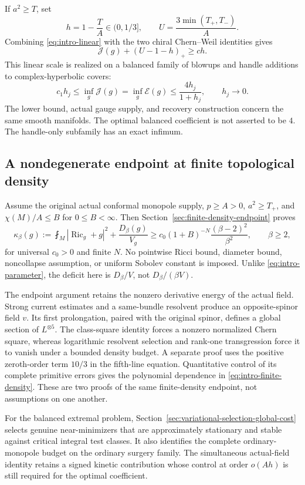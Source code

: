 \documentclass[10pt,a4paper]{article}
\theoremstyle{definition}
\theoremstyle{remark}
\numberwithin{equation}{section}
\providecommand{\Ric}{\operatorname{Ric}}
\providecommand{\E}{\mathcal E}
\providecommand{\J}{\mathcal J}
\begin{document}
If $a^2\ge T$, set
\[
 h=1-\frac TA\in(0,1/3],\qquad
 U=\frac{3\min(T_+,T_-)}{A}.
\]
Combining \eqref{eq:intro-linear} with the two chiral Chern--Weil
identities gives
\begin{equation}\label{eq:intro-window}
 \J(g)+(U-1-h)_+\ge ch.
\end{equation}
This linear scale is realized on a balanced family of blowups and
handle additions to complex-hyperbolic covers:
\[
 c_1h_j\le\inf_g\J(g)=\inf_g\E(g)
      \le\frac{4h_j}{1+h_j},\qquad h_j\longrightarrow0.
\]
The lower bound, actual gauge supply, and recovery construction concern
the same smooth manifolds. The optimal balanced coefficient is not
asserted to be $4$. The handle-only subfamily has an exact infimum.

\subsection{A nondegenerate endpoint at finite topological density}
Assume the original actual conformal monopole supply, $p\ge A>0$,
$a^2\ge T_+$, and $\chi(M)/A\le B$ for $0\le B<\infty$. Then
Section~\ref{sec:finite-density-endpoint} proves
\begin{equation}\label{eq:intro-finite-density}
 \kappa_\beta(g):=\fint_M|\Ric_g+g|^2+\frac{D_\beta(g)}{V_g}
 \ge c_0(1+B)^{-N}\frac{(\beta-2)^2}{\beta^2},\qquad\beta\ge2,
\end{equation}
for universal $c_0>0$ and finite $N$. No pointwise Ricci bound,
diameter bound, noncollapse assumption, or uniform Sobolev constant
is imposed. Unlike \eqref{eq:intro-parameter}, the deficit here is
$D_\beta/V$, not $D_\beta/(\beta V)$.

The endpoint argument retains the nonzero derivative energy of the
actual field. Strong current estimates and a same-bundle resolvent
produce an opposite-spinor field $v$. Its first prolongation, paired
with the original spinor, defines a global section of $L^{\otimes5}$. The
class-square identity forces a nonzero normalized Chern square, whereas
logarithmic resolvent selection and rank-one transgression force it
to vanish under a bounded density budget. A separate proof uses the
positive zeroth-order term $10/3$ in the fifth-line equation. Quantitative
control of its complete primitive errors gives the polynomial dependence
in \eqref{eq:intro-finite-density}. These are two proofs of the same
finite-density endpoint, not assumptions on one another.

For the balanced extremal problem,
Section~\ref{sec:variational-selection-global-cost} selects genuine
near-minimizers that are approximately stationary and stable against
critical integral test classes. It also identifies the complete
ordinary-monopole budget on the ordinary surgery family. The simultaneous
actual-field identity retains a signed kinetic contribution whose
control at order $o(Ah)$ is still required for the optimal coefficient.
\end{document}
